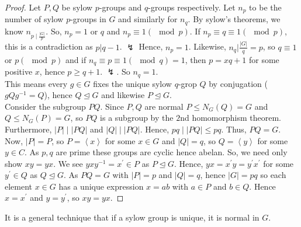 \begin{proof}
	Let \(P, Q\) be sylow \(p\)-groups and \(q\)-groups respectively. Let \(n_{p}\) to be the number of sylow \(p\)-groups in \(G\) and similarly for \(n_{q}\). By sylow's theorems, we know \(n_{p \mid \frac{\left| G \right| }{p}}\). So, \(n_{p} = 1\) or \(q\) and \(n_{p} \equiv 1 \left( \mod p \right) \). If \(n_{p} \equiv q \equiv 1 \left( \mod p \right) \), this is a contradiction as \(p | q-1\). \(\lightning\) Hence, \(n_{p}= 1\). Likewise, \(n_{q} | \frac{\left| G \right| }{q} = p\), so \(q \equiv 1\) or \(p \left( \mod p \right) \) and if \(n_{q} \equiv p \equiv 1 \left( \mod q \right)  = 1\), then \(p = xq + 1\) for some positive \(x\), hence \(p \ge q + 1\). \( \lightning\). So \(n_{q} = 1\).\\
	This means every \(g \in G\) fixes the unique sylow \(q\)-grop \(Q\) by conjugation (\(gQg^{-1} = Q\)), hence \(Q\trianglelefteq G\) and likewise \(P\trianglelefteq G\).\\
	Consider the subgroup \(PQ\). Since \(P, Q\) are normal \(P \le N_{G}\left( Q \right)  = G\) and \(Q \le N_{G} \left( P \right)  = G\), so \(PQ\) is a subgroup by the \(2\)nd homomorphism theorem. Furthermore, \(\left| P \right|  \mid \left| PQ \right| \) and \(\left| Q \right|  \mid \left| PQ \right| \). Hence, \(pq \mid \left| PQ \right| \le pq\). Thus, \(PQ = G\).\\
	Now, \(\left| P \right|  = P\), so \(P = \left<x \right> \) for some \(x \in G\) and \(\left| Q \right| = q\), so \(Q = \left<y \right> \) for some \(y \in C\). As \(p, q\) are prime these groups are cyclic hence abelan. So, we need only show \(xy=yx\). We see \(yxy^{-1} = x^{\prime} \in P\)  as \(P \trianglelefteq G\). Hence, \(yx=x^{\prime}y = y^{\prime}x^{\prime}\) for some \(y^{\prime} \in Q\) as \(Q \trianglelefteq G\). As \(PQ = G\) with \(\left| P \right| = p\) and \(\left| Q \right| = q\), hence \(\left| G \right|  = pq\) so each element \(x \in G\) has a unique expression \(x = ab\) with \(a \in P\) and \(b \in Q\). Hence \(x = x^{\prime}\) and \(y = y^{\prime}\), so \(xy=yx\).
\end{proof}
\begin{remark}
	It is a general technique that if a sylow group is unique, it is normal in \(G\).
\end{remark}
